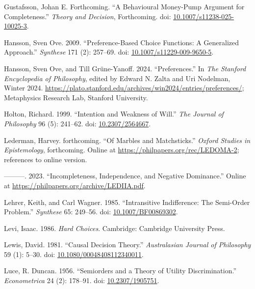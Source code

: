 \documentclass[
  11pt,
  letterpaper,
  DIV=11,
  numbers=noendperiod,
  twoside]{scrartcl}
\newlength{\cslhangindent}
\newenvironment{CSLReferences}[2] %
 {\begin{list}{}{%
  \setlength{\itemindent}{0pt}
  \setlength{\leftmargin}{0pt}
  \setlength{\parsep}{0pt}
  \ifodd #1
   \setlength{\leftmargin}{\cslhangindent}
   \setlength{\itemindent}{-1\cslhangindent}
  \fi
  \setlength{\itemsep}{#2\baselineskip}}}
 {\end{list}}
\begin{document}
\begin{CSLReferences}{1}{0}
Gustafsson, Johan E. Forthcoming. {``A Behavioural Money-Pump Argument
for Completeness.''} \emph{Theory and Decision}, Forthcoming. doi:
\href{https://doi.org/10.1007/s11238-025-10025-3}{10.1007/s11238-025-10025-3}.

Hansson, Sven Ove. 2009. {``Preference-Based Choice Functions: A
Generalized Approach.''} \emph{Synthese} 171 (2): 257--69. doi:
\href{https://doi.org/10.1007/s11229-009-9650-5}{10.1007/s11229-009-9650-5}.

Hansson, Sven Ove, and Till Grüne-Yanoff. 2024. {``{Preferences}.''} In
\emph{The {Stanford} Encyclopedia of Philosophy}, edited by Edward N.
Zalta and Uri Nodelman, {W}inter 2024.
\url{https://plato.stanford.edu/archives/win2024/entries/preferences/};
Metaphysics Research Lab, Stanford University.

Holton, Richard. 1999. {``Intention and Weakness of Will.''} \emph{The
Journal of Philosophy} 96 (5): 241--62. doi:
\href{https://doi.org/10.2307/2564667}{10.2307/2564667}.

Lederman, Harvey. forthcoming. {``Of Marbles and Matchsticks.''}
\emph{Oxford Studies in Epistemology}, forthcoming. Online at
\url{https://philpapers.org/rec/LEDOMA-2}; references to online version.

---------. 2023. {``Incompleteness, Independence, and Negative
Dominance.''} Online at \url{https://philpapers.org/archive/LEDIIA.pdf}.

Lehrer, Keith, and Carl Wagner. 1985. {``Intransitive Indifference: The
Semi-Order Problem.''} \emph{Synthese} 65: 249--56. doi:
\href{https://doi.org/10.1007/BF00869302}{10.1007/BF00869302}.

Levi, Isaac. 1986. \emph{Hard Choices}. Cambridge: Cambridge University
Press.

Lewis, David. 1981. {``Causal Decision Theory.''} \emph{Australasian
Journal of Philosophy} 59 (1): 5--30. doi:
\href{https://doi.org/10.1080/00048408112340011}{10.1080/00048408112340011}.

Luce, R. Duncan. 1956. {``Semiorders and a Theory of Utility
Discrimination.''} \emph{Econometrica} 24 (2): 178--91. doi:
\href{https://doi.org/10.2307/1905751}{10.2307/1905751}.


\end{CSLReferences}
\end{document}
